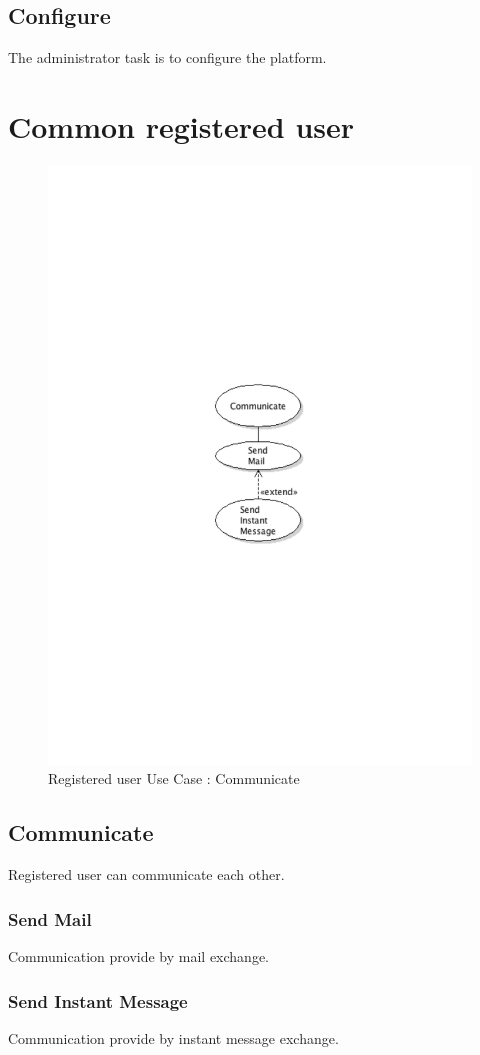 	\subsection{Configure}
		The administrator task is to configure the platform.
\newpage
\section{Common registered user}
	\begin{figure}[ht]
		\begin{center}
			\includegraphics[width=\textwidth,  trim=2cm 10cm 2cm 11cm]{UML_figure/UC/common/UC_Common_Communicate.pdf}
			\caption{Registered user Use Case : Communicate}
		\end{center}
	\end{figure}
	\subsection{Communicate}
		Registered user can communicate each other.
		\subsubsection{Send Mail}
			Communication provide by mail exchange.
		\subsubsection{Send Instant Message}
			Communication provide by instant message exchange.













